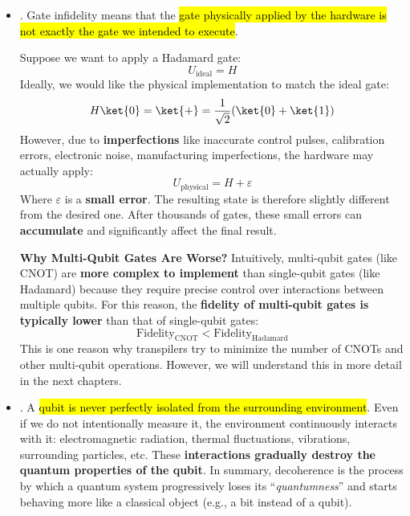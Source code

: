 \begin{itemize}
    \item {}. Gate infidelity means that the \hl{gate physically applied by the hardware is not exactly the gate we intended to execute}.

    Suppose we want to apply a Hadamard gate:
    \begin{equation*}
        U_{\text{ideal}} = H
    \end{equation*}
    Ideally, we would like the physical implementation to match the ideal gate:
    \begin{equation*}
        H\ket{0} = \ket{+} = \frac{1}{\sqrt{2}}(\ket{0} + \ket{1})
    \end{equation*}
    However, due to \textbf{imperfections} like inaccurate control pulses, calibration errors, electronic noise, manufacturing imperfections, the hardware may actually apply:
    \begin{equation*}
        U_{\text{physical}} = H + \varepsilon
    \end{equation*}
    Where $\varepsilon$ is a \textbf{small error}. The resulting state is therefore slightly different from the desired one. After thousands of gates, these small errors can \textbf{accumulate} and significantly affect the final result.

    \highspace
    \textcolor{Green3}{ \textbf{Why Multi-Qubit Gates Are Worse?}} Intuitively, multi-qubit gates (like CNOT) are \textbf{more complex to implement} than single-qubit gates (like Hadamard) because they require precise control over interactions between multiple qubits. For this reason, the \textbf{fidelity of multi-qubit gates is typically lower} than that of single-qubit gates:
    \begin{equation*}
        \text{Fidelity}_{\text{CNOT}} < \text{Fidelity}_{\text{Hadamard}}
    \end{equation*}
    This is one reason why transpilers try to minimize the number of CNOTs and other multi-qubit operations. However, we will understand this in more detail in the next chapters.


    \item {}. A \hl{qubit is never perfectly isolated from the surrounding environment}. Even if we do not intentionally measure it, the environment continuously interacts with it: electromagnetic radiation, thermal fluctuations, vibrations, surrounding particles, etc. These \textbf{interactions gradually destroy the quantum properties of the qubit}. In summary, decoherence is the process by which a quantum system progressively loses its ``\emph{quantumness}'' and starts behaving more like a classical object (e.g., a bit instead of a qubit).


\end{itemize}
